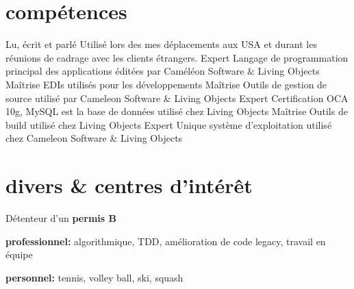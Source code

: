 \documentclass{friggeri-cv} 	%
\begin{document}
\section{compétences}

\begin{capabilitize}
		{Lu, écrit et parlé}
		{Utilisé lors des mes déplacements aux USA et durant les réunions de cadrage avec les clients
		étrangers.}
		{Expert}
		{Langage de programmation principal des applications éditées par Caméléon Software \& Living Objects}
		{Maîtrise}
		{EDIs utilisés pour les développements}
		{Maîtrise}
		{Outils de gestion de source utilisé par Cameleon Software \& Living Objects}
		{Expert}
		{Certification OCA 10g, MySQL est la base de données utilisé chez Living Objects}
		{Maîtrise}
		{Outils de build utilisé chez Living Objects}
		{Expert}
		{Unique système d'exploitation utilisé chez Cameleon Software \& Living Objects}
\end{capabilitize}


\section{divers \& centres d'intérêt}

Détenteur d'un \textbf{permis B}

\textbf{professionnel:} algorithmique, TDD, amélioration de code legacy, travail en équipe

\textbf{personnel:} tennis, volley ball, ski, squash
\end{document}
